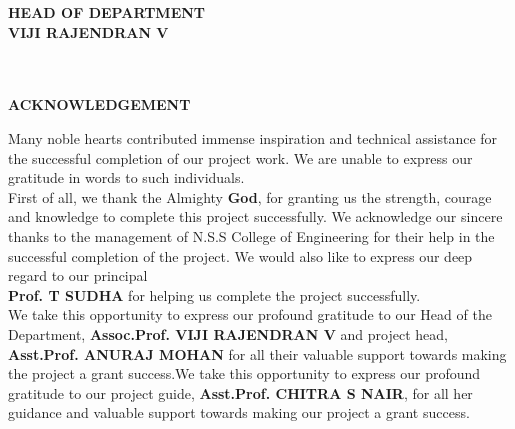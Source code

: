 \documentclass[12pt, a4paper]{article}
\begin{document}
\begin{titlepage}
\begin{center}
\begin{minipage}{.55\textwidth}
\end{minipage}
\begin{minipage}{.6\textwidth}
\vspace*{-36.5mm} 
\hspace*{-5mm}\textcolor{red!40!orange}{\normalsize  \textbf{HEAD OF DEPARTMENT}}\\[5mm]
{\hspace*{-5mm}\normalsize \textbf{VIJI RAJENDRAN V}}\\[-0.5mm]
\\[0.5mm]
\\[1cm]
\end{minipage}
\end{center}
\end{titlepage}
\newpage

\begin{center}
{\huge \bfseries ACKNOWLEDGEMENT} \\[3cm]
\end{center}
Many noble hearts contributed immense inspiration and technical assistance for the successful completion of our project work. We are unable to express our gratitude in words to such individuals. 
\\

\hspace{5mm}First of all, we thank the Almighty \textbf{God}, for granting us the strength, courage and knowledge to complete this project successfully. 
We acknowledge our sincere thanks to the management of N.S.S College of Engineering for their help in the successful completion of the project. We would also like to express our deep regard to our principal\\ \textbf{Prof. T SUDHA} for helping us  complete the project successfully. 
\\

\hspace{5mm}We take this opportunity to express our profound gratitude to our Head of  the  \\Department, \textbf{Assoc.Prof. VIJI RAJENDRAN V} and project head, \textbf{Asst.Prof. ANURAJ MOHAN} for all their valuable support towards making the project a grant success.We take this opportunity to express our profound gratitude to our project guide, \textbf{Asst.Prof.  CHITRA S NAIR},  for all her guidance and valuable support towards making our project a grant success. 
\\
\end{document}
